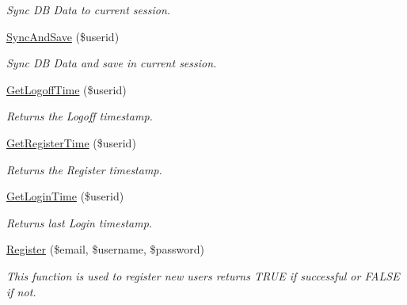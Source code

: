 \begin{DoxyCompactItemize}
\begin{DoxyCompactList}\small\item\em Sync D\-B Data to current session. \end{DoxyCompactList}\item 
\hypertarget{class_u_e4___account_handler_ab28ef0e5852924bf2a45cd51500b9505}{\hyperlink{class_u_e4___account_handler_ab28ef0e5852924bf2a45cd51500b9505}{Sync\-And\-Save} (\$userid)}\label{class_u_e4___account_handler_ab28ef0e5852924bf2a45cd51500b9505}

\begin{DoxyCompactList}\small\item\em Sync D\-B Data and save in current session. \end{DoxyCompactList}\item 
\hypertarget{class_u_e4___account_handler_a9403482ef7fdb211ffb9fa5f3b7e35cd}{\hyperlink{class_u_e4___account_handler_a9403482ef7fdb211ffb9fa5f3b7e35cd}{Get\-Logoff\-Time} (\$userid)}\label{class_u_e4___account_handler_a9403482ef7fdb211ffb9fa5f3b7e35cd}

\begin{DoxyCompactList}\small\item\em Returns the Logoff timestamp. \end{DoxyCompactList}\item 
\hypertarget{class_u_e4___account_handler_a7afe500be68628a4666221dee41d3b0c}{\hyperlink{class_u_e4___account_handler_a7afe500be68628a4666221dee41d3b0c}{Get\-Register\-Time} (\$userid)}\label{class_u_e4___account_handler_a7afe500be68628a4666221dee41d3b0c}

\begin{DoxyCompactList}\small\item\em Returns the Register timestamp. \end{DoxyCompactList}\item 
\hypertarget{class_u_e4___account_handler_a520b29af8723896a618d1bb9b65237fd}{\hyperlink{class_u_e4___account_handler_a520b29af8723896a618d1bb9b65237fd}{Get\-Login\-Time} (\$userid)}\label{class_u_e4___account_handler_a520b29af8723896a618d1bb9b65237fd}

\begin{DoxyCompactList}\small\item\em Returns last Login timestamp. \end{DoxyCompactList}\item 
\hypertarget{class_u_e4___account_handler_a64a469811f53b409679a9ad00cd88172}{\hyperlink{class_u_e4___account_handler_a64a469811f53b409679a9ad00cd88172}{Register} (\$email, \$username, \$password)}\label{class_u_e4___account_handler_a64a469811f53b409679a9ad00cd88172}

\begin{DoxyCompactList}\small\item\em This function is used to register new users returns T\-R\-U\-E if successful or F\-A\-L\-S\-E if not. \end{DoxyCompactList}\end{DoxyCompactItemize}
